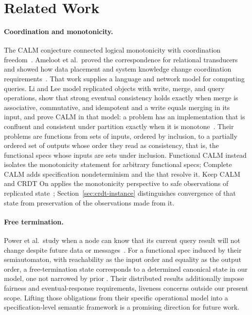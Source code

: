 \section{Related Work}
\label{sec:related}

\paragraph{Coordination and monotonicity.}
The CALM conjecture connected logical monotonicity with coordination
freedom~\cite{hellerstein2010declarative,hellerstein2020keeping}.  Ameloot et
al.\ proved the correspondence for relational transducers and showed how data
placement and system knowledge change coordination
requirements~\cite{ameloot2013relational,ameloot2015weaker}.  That work supplies a language
and network model for computing queries.  Li and Lee model replicated objects
with write, merge, and query operations, show that strong eventual consistency
holds exactly when merge is associative, commutative, and idempotent and a
write equals merging in its input, and prove CALM in that model: a problem has
an implementation that is confluent and consistent under partition exactly when
it is monotone~\cite{li2025coordinationfree}.  Their problems are functions
from sets of inputs, ordered by inclusion, to a partially ordered set of
outputs whose order they read as consistency, that is, the functional specs
whose inputs are sets under inclusion.  Functional CALM instead isolates the
monotonicity statement for arbitrary functional specs; Complete
CALM adds specification nondeterminism and the \commitments that resolve it.  Keep CALM
and CRDT On applies the monotonicity perspective to safe observations of
replicated state~\cite{laddad2022keep}; Section~\ref{sec:crdt-instance}
distinguishes convergence of that state from preservation of the observations
made from it.

\paragraph{Free termination.}
Power et al.\ study when a node can know that its current query result will not
change despite future data or messages~\cite{power2025freetermination}.  For a
functional spec induced by their semiautomaton, with reachability as
the input order and equality as the output order, a free-termination state
corresponds to a determined canonical state in our model, one not narrowed by
prior \commitments.  Their distributed results additionally impose fairness
and eventual-response requirements, liveness concerns outside our present
scope.  Lifting those obligations from their specific operational model into
a specification-level semantic framework is a promising direction for future
work.


